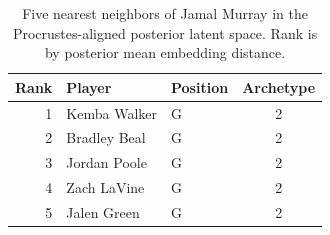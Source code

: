 \begin{table}[htbp]
  \centering\small
  \begin{tabular}{rllc}
    \toprule
    Rank & Player & Position & Archetype \\
    \midrule
    1 & Kemba Walker & G & 2 \\
    2 & Bradley Beal & G & 2 \\
    3 & Jordan Poole & G & 2 \\
    4 & Zach LaVine & G & 2 \\
    5 & Jalen Green & G & 2 \\
    \bottomrule
  \end{tabular}
  \caption{Five nearest neighbors of Jamal Murray in the Procrustes-aligned posterior latent space. Rank is by posterior mean embedding distance.}
  \label{tab:Jamal_Murray_neighbors}
\end{table}

